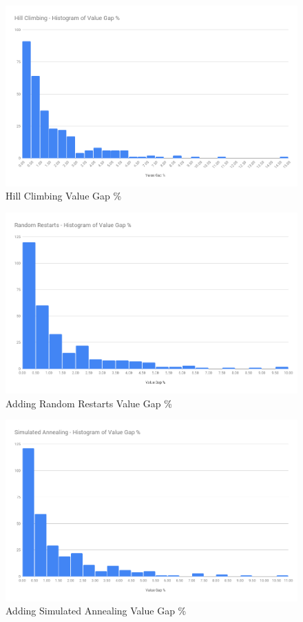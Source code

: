\begin{figure}[!htbp]
    \centering
    \includegraphics[width=\textwidth]{Figures/Metaheuristics/hill_climb_value_gap.png}
    \caption{Hill Climbing Value Gap \%}
    \label{fig:value_gap_perc_hill_climb}
\end{figure}

\begin{figure}[!htbp]
    \centering
    \includegraphics[width=\textwidth]{Figures/Metaheuristics/restarts_value_gap.png}
    \caption{Adding Random Restarts Value Gap \%}
    \label{fig:value_gap_perc_restarts}
\end{figure}

\begin{figure}[!htbp]
    \centering
    \includegraphics[width=\textwidth]{Figures/Metaheuristics/annealing_value_gap.png}
    \caption{Adding Simulated Annealing Value Gap \%}
    \label{fig:value_gap_perc_annealing}
\end{figure}

